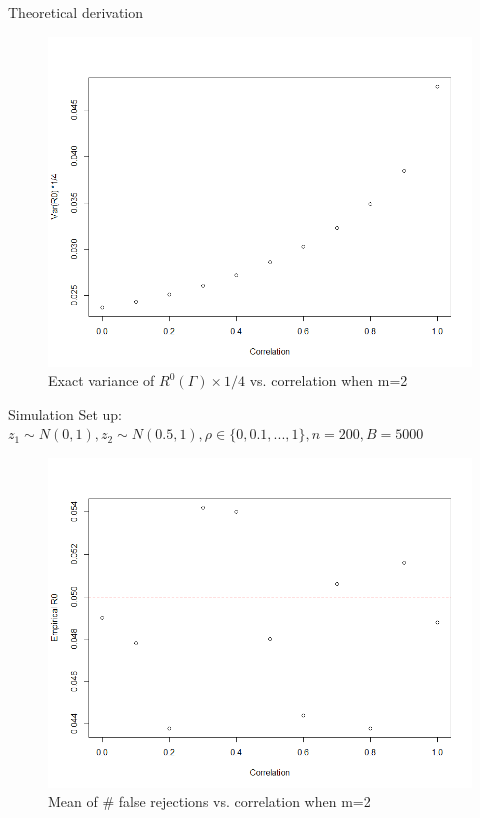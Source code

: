 \documentclass{beamer}
\begin{document}
\begin{frame}[t]{Theoretical derivation}\vspace{10pt}
\begin{figure}[h]
	\centering
	\includegraphics[scale=0.35]{exact_m=2_var}
	\caption{\footnotesize{Exact variance of $R^0(\Gamma) \times 1/4$ vs. correlation when m=2}}
	\label{fig2}
\end{figure}

\end{frame}

\begin{frame}[t]{Simulation}\vspace{10pt}
Set up: $z_1 \sim N(0,1), z_2 \sim N(0.5,1), \rho \in \{0,0.1,...,1\}, n=200, B=5000$
\begin{figure}[h]
	\centering
	\includegraphics[scale=0.35]{empirical_m=2}
	\caption{\footnotesize{Mean of \# false rejections vs. correlation when m=2}}
	\label{fig3}
\end{figure}
\end{frame}
\end{document}
